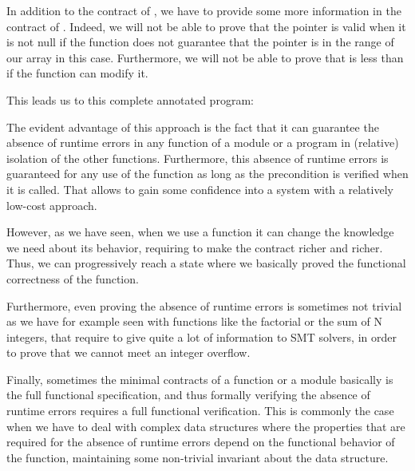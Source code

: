 In addition to the contract of , we have to provide some more
information in the contract of . Indeed, we will not be able
to prove that the pointer is valid when it is not null if the function does not
guarantee that the pointer is in the range of our array in this case.
Furthermore, we will not be able to prove that  is less than
 if the function can modify it.


This leads us to this complete annotated program:






The evident advantage of this approach is the fact that it can guarantee the
absence of runtime errors in any function of a module or a program in (relative)
isolation of the other functions. Furthermore, this absence of runtime errors
is guaranteed for any use of the function as long as the precondition is
verified when it is called. That allows to gain some confidence into a system
with a relatively low-cost approach.



However, as we have seen, when we use a function it can change the knowledge
we need about its behavior, requiring to make the contract richer and richer.
Thus, we can progressively reach a state where we basically proved the functional
correctness of the function.



Furthermore, even proving the absence of runtime errors is sometimes not trivial
as we have for example seen with functions like the factorial or the sum of
N integers, that require to give quite a lot of information to SMT solvers, in
order to prove that we cannot meet an integer overflow.



Finally, sometimes the minimal contracts of a function or a module basically
is the full functional specification, and thus formally verifying the absence
of runtime errors requires a full functional verification. This is commonly the
case when we have to deal with complex data structures where the properties
that are required for the absence of runtime errors depend on the functional
behavior of the function, maintaining some non-trivial invariant about the
data structure.







